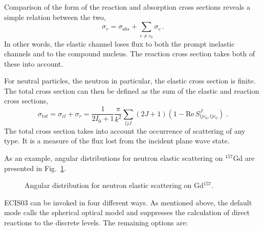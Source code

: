 \documentclass[twocolumn,amsmath,amssymb,10pt,groupedaddress,a4paper]{revtex4}
\begin{document}
Comparison of the form of the reaction and absorption cross sections
reveals a simple relation between the two, \begin{equation}
\sigma_{r}=\sigma_{abs}+\sum_{c\neq c_{0}}\sigma_{c}\,.\end{equation}
 In other words, the elastic channel loses flux to both the prompt
inelastic channels and to the compound nucleus. The reaction
cross section takes both of these into account.

For neutral particles, the neutron in particular, the elastic cross
section is finite. The total cross section can then be defined as the
sum of the elastic and reaction cross sections, \begin{equation}
\sigma_{tot}=\sigma_{el}+\sigma_{r}=\frac{1}{2I_{0}+1}\frac{\pi}{k^{2}}\sum_{ljJ}(2J+1)(1-\textrm{Re}\, S_{ljc_{0},ljc_{0}}^{J})\;.\end{equation}
 The total cross section takes into account the occurrence of scattering
of any type. It is a measure of the flux lost from the incident plane
wave state.

As an example, angular distributions for neutron elastic scattering
on $^{157}$Gd are presented in Fig.~\ref{njoygd157}. %
\begin{figure}[htbp]

\caption{Angular distribution for neutron elastic scattering on Gd$^{157}$.}

\label{njoygd157}
\end{figure}

ECIS03 can be invoked in four different ways. As mentioned
above, the default mode calls the spherical optical model and
suppresses the calculation of direct
reactions to the discrete levels. The remaining options are:
\end{document}
